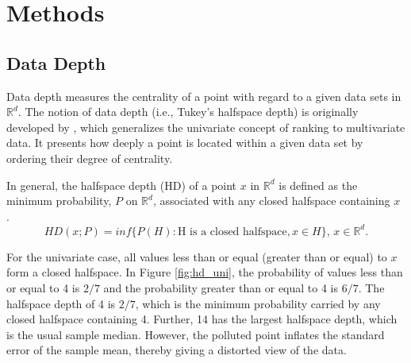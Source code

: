 \documentclass[a4paper,UKenglish]{lipics-v2016}
\begin{document}
%
%


\section{Methods}
\label{sec:methods}

\subsection{Data Depth}
Data depth measures the centrality of a point with regard to a given data sets in $\mathbb{R}^d$.  The notion of data depth (i.e., Tukey's halfspace depth) is originally developed by \cite{tukey75ICM}, which generalizes the univariate concept of ranking to multivariate data. It presents how deeply a point is located within a given data set by ordering their degree of centrality. 

In general, the halfspace depth (HD) of a point $x$ in  $\mathbb{R}^d$ is defined as the minimum probability, $P$ on  $\mathbb{R}^d$, associated with any closed halfspace containing $x$ \cite{liu00AS}. 
\begin{equation*}\label{eq:hd}
HD(x;P) = inf\{P(H): \text{H is a closed halfspace}, x \in H\}\text{, } x \in \mathbb{R}^d.
\end{equation*}

For the univariate case, all values less than or equal (greater than or equal) to $x$ form a closed halfspace. 
In Figure \ref{fig:hd_uni}, the probability of values less than or equal to 4 is  $2/7$ and the probability greater than or equal to 4 is $6/7$. The halfspace depth of 4 is $2/7$, which is the minimum probability carried by any closed halfspace containing 4. Further, 14 has the largest halfspace depth, which is the usual sample median. However, the polluted point inflates the standard error of the sample mean, thereby giving a distorted view of the data. 
\end{document}
